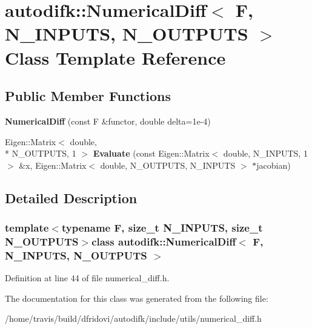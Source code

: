 \hypertarget{classautodifk_1_1_numerical_diff}{\section{autodifk\-:\-:Numerical\-Diff$<$ F, N\-\_\-\-I\-N\-P\-U\-T\-S, N\-\_\-\-O\-U\-T\-P\-U\-T\-S $>$ Class Template Reference}
\label{classautodifk_1_1_numerical_diff}
}
\subsection*{Public Member Functions}
\begin{DoxyCompactItemize}
\item 
\hypertarget{classautodifk_1_1_numerical_diff_acac50b5ed0b3b542c91f270e8b8796f5}{{\bfseries Numerical\-Diff} (const F \&functor, double delta=1e-\/4)}\label{classautodifk_1_1_numerical_diff_acac50b5ed0b3b542c91f270e8b8796f5}

\item 
\hypertarget{classautodifk_1_1_numerical_diff_ab3d1403a7cd6337116938de27b02651c}{Eigen\-::\-Matrix$<$ double, \\*
N\-\_\-\-O\-U\-T\-P\-U\-T\-S, 1 $>$ {\bfseries Evaluate} (const Eigen\-::\-Matrix$<$ double, N\-\_\-\-I\-N\-P\-U\-T\-S, 1 $>$ \&x, Eigen\-::\-Matrix$<$ double, N\-\_\-\-O\-U\-T\-P\-U\-T\-S, N\-\_\-\-I\-N\-P\-U\-T\-S $>$ $\ast$jacobian)}\label{classautodifk_1_1_numerical_diff_ab3d1403a7cd6337116938de27b02651c}

\end{DoxyCompactItemize}


\subsection{Detailed Description}
\subsubsection*{template$<$typename F, size\-\_\-t N\-\_\-\-I\-N\-P\-U\-T\-S, size\-\_\-t N\-\_\-\-O\-U\-T\-P\-U\-T\-S$>$class autodifk\-::\-Numerical\-Diff$<$ F, N\-\_\-\-I\-N\-P\-U\-T\-S, N\-\_\-\-O\-U\-T\-P\-U\-T\-S $>$}



Definition at line 44 of file numerical\-\_\-diff.\-h.



The documentation for this class was generated from the following file\-:\begin{DoxyCompactItemize}
\item 
/home/travis/build/dfridovi/autodifk/include/utils/numerical\-\_\-diff.\-h\end{DoxyCompactItemize}
